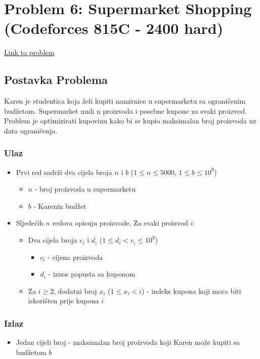 \section{Problem 6: Supermarket Shopping (Codeforces 815C - 2400 hard)}
\href{https://codeforces.com/problemset/problem/815/C}{Link to problem}

\subsection{Postavka Problema}
Karen je studentica koja želi kupiti namirnice u supermarketu sa ograničenim budžetom. Supermarket nudi n proizvoda i posebne kupone za svaki proizvod. Problem je optimizirati kupovinu kako bi se kupio maksimalan broj proizvoda uz data ograničenja.

\subsubsection{Ulaz}
\begin{itemize}
    \item Prvi red sadrži dva cijela broja $n$ i $b$ ($1 \leq n \leq 5000$, $1 \leq b \leq 10^9$)
        \begin{itemize}
            \item $n$ - broj proizvoda u supermarketu
            \item $b$ - Karenin budžet
        \end{itemize}
    \item Sljedećih $n$ redova opisuju proizvode. Za svaki proizvod $i$:
        \begin{itemize}
            \item Dva cijela broja $c_i$ i $d_i$ ($1 \leq d_i < c_i \leq 10^9$)
                \begin{itemize}
                    \item $c_i$ - cijena proizvoda
                    \item $d_i$ - iznos popusta sa kuponom
                \end{itemize}
            \item Za $i \geq 2$, dodatni broj $x_i$ ($1 \leq x_i < i$) - indeks kupona koji mora biti iskorišten prije kupona $i$
        \end{itemize}
\end{itemize}

\subsubsection{Izlaz}
\begin{itemize}
    \item Jedan cijeli broj - maksimalan broj proizvoda koji Karen može kupiti sa budžetom $b$
\end{itemize}

